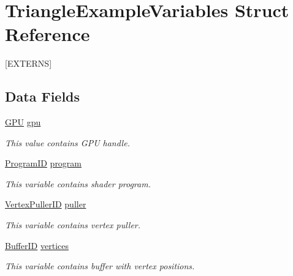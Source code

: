 \hypertarget{structTriangleExampleVariables}{}\section{Triangle\+Example\+Variables Struct Reference}
\label{structTriangleExampleVariables}


\mbox{[}E\+X\+T\+E\+R\+NS\mbox{]}  


\subsection*{Data Fields}
\begin{DoxyCompactItemize}
\item 
\hyperlink{fwd_8h_a06964ec111fe28721d8618b6d0d993bf}{G\+PU} \hyperlink{structTriangleExampleVariables_a6c5c3f82065ae9aac07f9e6f11dd03b3}{gpu}\hypertarget{structTriangleExampleVariables_a6c5c3f82065ae9aac07f9e6f11dd03b3}{}\label{structTriangleExampleVariables_a6c5c3f82065ae9aac07f9e6f11dd03b3}

\begin{DoxyCompactList}\small\item\em This value contains G\+PU handle. \end{DoxyCompactList}\item 
\hyperlink{fwd_8h_a15e62786033208aec9487a51e808f81d}{Program\+ID} \hyperlink{structTriangleExampleVariables_aabf788228d2e91e2718facfbd911c8cc}{program}\hypertarget{structTriangleExampleVariables_aabf788228d2e91e2718facfbd911c8cc}{}\label{structTriangleExampleVariables_aabf788228d2e91e2718facfbd911c8cc}

\begin{DoxyCompactList}\small\item\em This variable contains shader program. \end{DoxyCompactList}\item 
\hyperlink{fwd_8h_a23828e2281a794e193ebaf0df3e1f17c}{Vertex\+Puller\+ID} \hyperlink{structTriangleExampleVariables_a82e39dd0d18fc57422686229d801e39f}{puller}\hypertarget{structTriangleExampleVariables_a82e39dd0d18fc57422686229d801e39f}{}\label{structTriangleExampleVariables_a82e39dd0d18fc57422686229d801e39f}

\begin{DoxyCompactList}\small\item\em This variable contains vertex puller. \end{DoxyCompactList}\item 
\hyperlink{fwd_8h_a60a12bf4868ebe47cc571ce96a03f99c}{Buffer\+ID} \hyperlink{structTriangleExampleVariables_acb7968b625f2e01866994769209cf32e}{vertices}\hypertarget{structTriangleExampleVariables_acb7968b625f2e01866994769209cf32e}{}\label{structTriangleExampleVariables_acb7968b625f2e01866994769209cf32e}

\begin{DoxyCompactList}\small\item\em This variable contains buffer with vertex positions. \end{DoxyCompactList}\end{DoxyCompactItemize}


